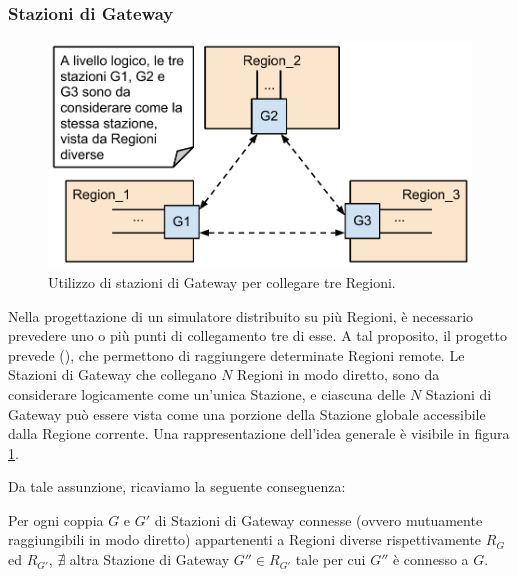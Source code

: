 	
	\subsubsection{Stazioni di Gateway}\label{sec:gateway_stations}
	
	\begin{figure}[htbp]
		\begin{center}
			\includegraphics[width=\textwidth,keepaspectratio]{imgs/gateway_stations.pdf}
			\caption{\footnotesize{Utilizzo di stazioni di Gateway per collegare tre Regioni.}}
			\label{fig:gateway_stations}
		\end{center}
	\end{figure}

	Nella progettazione di un simulatore distribuito su più Regioni, è necessario prevedere uno o più punti di collegamento tre di esse. A tal proposito, il progetto prevede  (), che permettono di raggiungere determinate Regioni remote. Le Stazioni di Gateway che collegano $N$ Regioni in modo diretto, sono da considerare logicamente come un'unica Stazione, e ciascuna delle $N$ Stazioni di Gateway può essere vista come una porzione della Stazione globale accessibile dalla Regione corrente. Una rappresentazione dell'idea generale è visibile in figura \ref{fig:gateway_stations}.
	
	Da tale assunzione, ricaviamo la seguente conseguenza:
	\begin{consequence}\label{cons:gateway_unique}
	Per ogni coppia $G$ e $G'$ di Stazioni di Gateway connesse (ovvero mutuamente raggiungibili in modo diretto) appartenenti a Regioni diverse rispettivamente $R_G$ ed $R_{G'}$, $\nexists$ altra Stazione di Gateway $G'' \in R_{G'}$ tale per cui $G''$ è connesso a $G$.
	\end{consequence}

